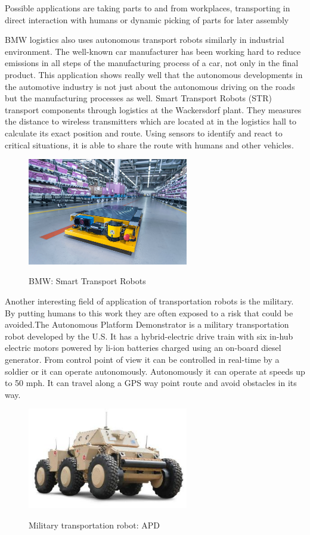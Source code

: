 \documentclass[12pt,english]{article}
\begin{document}
\noindent Possible applications are taking parts to and from workplaces, transporting in direct interaction with humans or dynamic picking of parts for later assembly

BMW logistics also uses autonomous transport robots similarly in industrial environment. The well-known car manufacturer has been working hard to reduce emissions in all steps of the manufacturing process of a car, not only in the final product. This application shows really well that the autonomous developments in the automotive industry is not just about the autonomous driving on the roads but the manufacturing processes as well. Smart Transport Robots (STR) transport components through logistics at the Wackersdorf plant. They measures the distance to wireless transmitters which are located at in the logistics hall to calculate its exact position and route. Using sensors to identify and react to critical situations, it is able to share the route with humans and other vehicles. \cite{bmw}

\begin{figure}[h]
	\centering
	\includegraphics[width=7cm]{bmw.jpg}
	\label{bmw}
	\caption{BMW: Smart Transport Robots}
\end{figure}

Another interesting field of application of transportation robots is the military. By putting humans to this work they are often exposed to a risk that could be avoided.The Autonomous Platform Demonstrator is a military transportation robot developed by the U.S. It has a hybrid-electric drive train with six in-hub electric motors powered by li-ion batteries charged using an on-board diesel generator. From control point of view it can be controlled in real-time by a soldier or it can operate autonomously. Autonomously it can operate at speeds up to 50 mph. It can travel along a GPS way point route and avoid obstacles in its way. \cite{apd}

\begin{figure}[h]
	\centering
	\includegraphics[width=7cm]{apd.jpg}
	\label{bmw}
	\caption{Military transportation robot: APD}
\end{figure}
\end{document}

